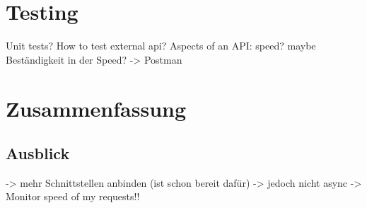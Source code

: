 \documentclass[12pt,twoside,a4paper]{article}
\begin{document}
\section{Testing}
Unit tests?
How to test external api?
Aspects of an API: speed? maybe Beständigkeit in der Speed?
-> Postman
\section{Zusammenfassung}
\subsection{Ausblick}
-> mehr Schnittstellen anbinden (ist schon bereit dafür)
-> jedoch nicht async
-> Monitor speed of my requests!!
\newpage


\end{document}
